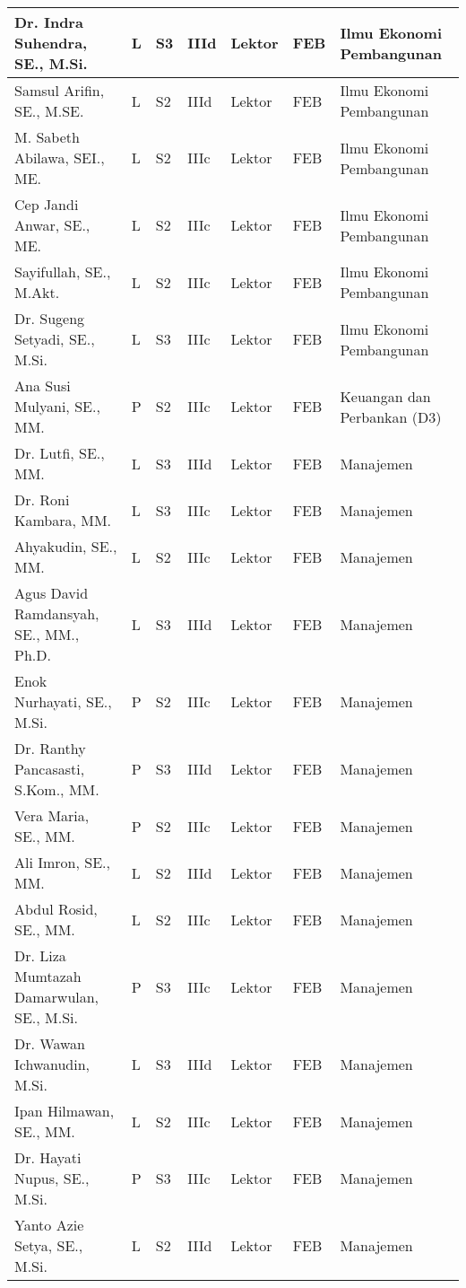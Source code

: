 \documentclass[
]{book}
\begin{document}
\begin{longtable}{l|l|l|l|l|l|l}
\hline
Dr. Indra Suhendra, SE., M.Si. & L & S3 & IIId & Lektor & FEB & Ilmu Ekonomi Pembangunan\\
\hline
Samsul Arifin, SE., M.SE. & L & S2 & IIId & Lektor & FEB & Ilmu Ekonomi Pembangunan\\
\hline
M. Sabeth Abilawa, SEI., ME. & L & S2 & IIIc & Lektor & FEB & Ilmu Ekonomi Pembangunan\\
\hline
Cep Jandi Anwar, SE., ME. & L & S2 & IIIc & Lektor & FEB & Ilmu Ekonomi Pembangunan\\
\hline
Sayifullah, SE., M.Akt. & L & S2 & IIIc & Lektor & FEB & Ilmu Ekonomi Pembangunan\\
\hline
Dr. Sugeng Setyadi, SE., M.Si. & L & S3 & IIIc & Lektor & FEB & Ilmu Ekonomi Pembangunan\\
\hline
Ana Susi Mulyani, SE., MM. & P & S2 & IIIc & Lektor & FEB & Keuangan dan Perbankan (D3)\\
\hline
Dr. Lutfi, SE., MM. & L & S3 & IIId & Lektor & FEB & Manajemen\\
\hline
Dr. Roni Kambara, MM. & L & S3 & IIIc & Lektor & FEB & Manajemen\\
\hline
Ahyakudin, SE., MM. & L & S2 & IIIc & Lektor & FEB & Manajemen\\
\hline
Agus David Ramdansyah, SE., MM., Ph.D. & L & S3 & IIId & Lektor & FEB & Manajemen\\
\hline
Enok Nurhayati, SE., M.Si. & P & S2 & IIIc & Lektor & FEB & Manajemen\\
\hline
Dr. Ranthy Pancasasti, S.Kom., MM. & P & S3 & IIId & Lektor & FEB & Manajemen\\
\hline
Vera Maria, SE., MM. & P & S2 & IIIc & Lektor & FEB & Manajemen\\
\hline
Ali Imron, SE., MM. & L & S2 & IIId & Lektor & FEB & Manajemen\\
\hline
Abdul Rosid, SE., MM. & L & S2 & IIIc & Lektor & FEB & Manajemen\\
\hline
Dr. Liza Mumtazah Damarwulan, SE., M.Si. & P & S3 & IIIc & Lektor & FEB & Manajemen\\
\hline
Dr. Wawan Ichwanudin, M.Si. & L & S3 & IIId & Lektor & FEB & Manajemen\\
\hline
Ipan Hilmawan, SE., MM. & L & S2 & IIIc & Lektor & FEB & Manajemen\\
\hline
Dr. Hayati Nupus, SE., M.Si. & P & S3 & IIIc & Lektor & FEB & Manajemen\\
\hline
Yanto Azie Setya, SE., M.Si. & L & S2 & IIId & Lektor & FEB & Manajemen\\

\end{longtable}
\end{document}
